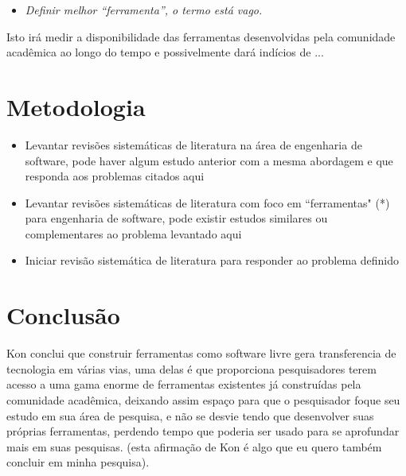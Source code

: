 \documentclass[11pt]{article}
\begin{document}

\begin{itemize}
\item {\it Definir melhor “ferramenta”, o termo está vago.}
\end{itemize}

Isto irá medir a disponibilidade das ferramentas desenvolvidas pela comunidade
acadêmica ao longo do tempo e possivelmente dará indícios de ...


\section{Metodologia}

\begin{itemize}
\item Levantar revisões sistemáticas de literatura na área de engenharia de
  software, pode haver algum estudo anterior com a mesma abordagem e que
  responda aos problemas citados aqui
\item Levantar revisões sistemáticas de literatura com foco em “ferramentas"
  (*) para engenharia de software, pode existir estudos similares ou
  complementares ao problema levantado aqui
\item Iniciar revisão sistemática de literatura para responder ao problema
  definido
\end{itemize}

\section{Conclusão}

Kon \cite{Kon11} conclui que construir ferramentas como software livre gera
transferencia de tecnologia em várias vias, uma delas é que proporciona
pesquisadores terem acesso a uma gama enorme de ferramentas existentes já
construídas pela comunidade acadêmica, deixando assim espaço para que o
pesquisador foque seu estudo em sua área de pesquisa, e não se desvie tendo
que desenvolver suas próprias ferramentas, perdendo tempo que poderia ser
usado para se aprofundar mais em suas pesquisas. (esta afirmação de Kon é algo
que eu quero também concluir em minha pesquisa).
\end{document}
